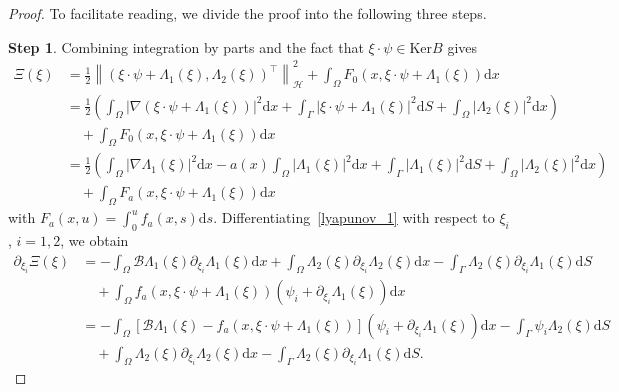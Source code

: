 \documentclass{elsarticle}
\begin{document}
\begin{proof}
To facilitate reading, we divide the proof into the following three steps.

\textbf{Step 1}. Combining integration by parts and the fact that $\xi\cdot\psi\in\mathrm{Ker}B$ gives
\begin{equation} \label{lyapunov_1}
\begin{split}
\Xi(\xi) &= \frac{1}{2}\left\|\left(\xi\cdot\psi + \Lambda_1(\xi), \Lambda_2(\xi)\right)^{\top}\right\|^2_{\mathcal{H}} + \int_{\Omega}F_0(x, \xi\cdot\psi + \Lambda_1(\xi))\mathrm{d}x\\
&= \frac{1}{2}\left(\int_{\Omega}|\nabla (\xi\cdot\psi + \Lambda_1(\xi))|^2\mathrm{d}x + \int_{\Gamma}|\xi\cdot\psi +\Lambda_1(\xi)|^2\mathrm{d}S + \int_{\Omega}|\Lambda_2(\xi)|^2\mathrm{d}x\right) \\
&\quad + \int_{\Omega}F_0(x, \xi\cdot\psi + \Lambda_1(\xi))\mathrm{d}x\\
&= \frac{1}{2}\left(\int_{\Omega}|\nabla  \Lambda_1(\xi)|^2\mathrm{d}x - a(x)\int_{\Omega}|  \Lambda_1(\xi)|^2\mathrm{d}x + \int_{\Gamma}|\Lambda_1(\xi)|^2\mathrm{d}S + \int_{\Omega}|\Lambda_2(\xi)|^2\mathrm{d}x\right) \\
&\quad+\int_{\Omega}F_a(x, \xi\cdot\psi + \Lambda_1(\xi))\mathrm{d}x
\end{split}
\end{equation}
with $F_a(x, u)=\int_{0}^{u}f_a(x, s)\mathrm{d}s$.
Differentiating~\eqref{lyapunov_1} with respect to $\xi_i$, $i=1, 2$, we obtain
\begin{equation}\label{lyapunov_2}
\begin{split}
\partial_{\xi_i}\Xi(\xi) &=  -\int_{\Omega}\mathcal{B}\Lambda_1(\xi)\partial_{\xi_i}\Lambda_1(\xi)\mathrm{d}x + \int_{\Omega}\Lambda_2(\xi)\partial_{\xi_i}\Lambda_2(\xi)\mathrm{d}x-\int_{\Gamma} \Lambda_2(\xi)\partial_{\xi_i}\Lambda_1(\xi)\mathrm{d}S\\
&\quad + \int_{\Omega}f_a(x, \xi\cdot\psi + \Lambda_1(\xi))(\psi_i + \partial_{\xi_i}\Lambda_1(\xi))\mathrm{d}x\\
&=  -\int_{\Omega}[\mathcal{B}\Lambda_1(\xi)-f_a(x, \xi\cdot\psi + \Lambda_1(\xi))](\psi_i + \partial_{\xi_i}\Lambda_1(\xi))\mathrm{d}x - \int_{\Gamma}\psi_i \Lambda_2(\xi)\mathrm{d}S\\
&\quad + \int_{\Omega}\Lambda_2(\xi)\partial_{\xi_i}\Lambda_2(\xi)\mathrm{d}x-\int_{\Gamma} \Lambda_2(\xi)\partial_{\xi_i}\Lambda_1(\xi)\mathrm{d}S.
\end{split}
\end{equation}

\end{proof}
\end{document}

